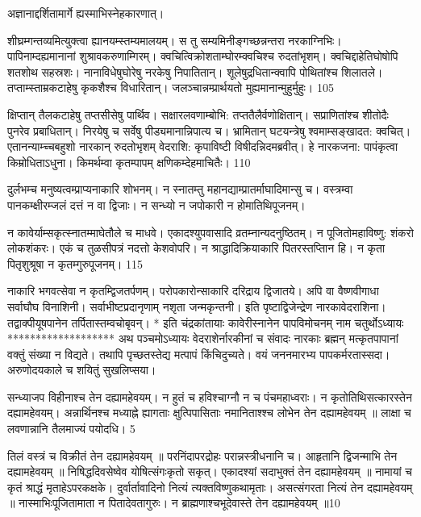   अज्ञानाद्दर्शितामार्गे ह्यस्माभिस्नेहकारणात्।
 

शीघ्रम्गन्तव्यमित्युक्त्वा ह्यानयम्स्तम्यमालयम्।
 स तु सम्यमिनीङ्गच्छन्नन्तरा नरकाग्निभिः।
 पापिनाम्दह्यमानानां शुश्रावकरुणाम्गिरम्।
 क्वचित्विक्रोशताम्घोरम्क्वचिश्च रुदतांभृशम्।
 क्वचिद्दाहेतिघोषोपि शतशोथ सहस्रशः।
 नानाविधेषुघोरेषु नरकेषु निपातितान्।
 शूलेषुद्रधितान्क्वापि पोथितांश्च शिलातले।
 तप्ताम्स्ताम्रकटाहेषु कृकशैश्च विधारितान्।
 जलञ्चान्नम्प्रार्थयतो मुह्यमानान्मुहुर्मुहुः।
 105

  क्षिप्तान् तैलकटाहेषु तप्तसीसेषु पार्थिव।
 सक्षारलवणाम्बोभि: तप्ततैलैर्वणोक्षितान्।
 सप्राणितांश्च शीतोदैः पुनरेव प्रबाधितान्।
 निरयेषु च सर्वेषु पीड्यमानान्निपात्य च।
 भ्रामितान् घटयन्त्रेषु श्वमाम्सङ्खादत: क्वचित्।
 एतानन्याम्च्चबहुशो नारकान् रुदतोभृशम् वेदराशि: कृपाविष्टी विषीदन्निदमब्रवीत्।
 हे नारकजना: पापंकृत्वा किम्रोधिताऽधुना।
 किमर्थम्वा कृतम्पापम् क्षणिकम्देहमाचितैः।
 110

  दुर्लभम्च मनुष्यत्वम्प्राप्यनाकारि शोभनम्।
 न स्नातम्तु महानद्याम्प्रातर्माघादिमान्सु च।
 वस्त्रम्वा पानकम्क्षीरम्जलं दत्तं न वा द्विजाः।
 न सन्ध्यो न जपोकारी न होमातिथिपूजनम्।
 

न कावेर्याम्सकृत्स्नातम्माघेतौले च माधवे।
 एकादश्युपवासादि व्रतम्नान्यदनुष्ठितम्।
 न पूजितोमहाविष्णु: शंकरो लोकशंकरः।
 एकं च तुळसीपत्रं नदत्तो केशवोपरि।
 न श्राद्धादिक्रियाकारि पितरस्तप्तिान हि।
 न कृता पितृशुश्रूषा न कृतम्गुरुपूजनम्।
 115

  नाकारि भगवत्सेवा न कृतम्द्विजतर्पणम्।
 परोपकारोन्साकारि दरिद्राय द्विजातये।
 अपि वा वैष्णवीगाधा सर्वाघौघ विनाशिनी।
 सर्वाभीष्टप्रदानृणाम् नशृता जन्मकृन्तनी।
 इति पृष्टाद्विजेन्द्रेण नारकावेदराशिना।
 तद्वाक्पीयूषपानेन तर्पितास्तम्वचोबृवन्।
 * इति चंद्रकांतायाः कावेरीस्नानेन पापविमोचनम् नाम
चतुर्थोऽध्यायः
*******************
अथ पञ्चमोऽध्यायः वेदराशेर्नारकीनां च संवादः
नारकाः
ब्रह्मन् मत्कृतपापानां वक्तुं संख्या न विद्यते।
 तथापि पृच्छतस्तेद्य मत्पापं किंचिदुच्यते।
 वयं जननमारभ्य पापकर्मरतास्सदा।
 अरुणोदयकाले च शयितुं सुखलिप्सया।
 


सन्ध्याजप विहीनाश्च तेन दह्यामहेवयम्।
 न हुतं च हविश्चाग्नौ न च पंचमहाध्वराः।
 न कृतोतिथिसत्कारस्तेन दह्यामहेवयम्।
 अन्नार्थिनश्च मध्याह्ने ह्यागताः क्षुत्पिपासिताः नमानिताश्श्च लोभेन तेन दह्यामहेवयम् ॥ लाक्षा च लवणान्नानि तैलमाज्यं पयोदधि।
 5

  तिलं वस्त्रं च विक्रीतं तेन दह्यामहेवयम् ॥ परनिंदापरद्रोहः परान्नस्त्रीधनानि च।
 आहृतानि द्विजन्माभि तेन दह्यामहेवयम् ॥ निषिद्धदिवसेष्वेव योषित्संगःकृतो सकृत्।
 एकादश्यां सदाभुक्तं तेन दह्यामहेवयम् ॥ नामायां च कृतं श्राद्धं मृताहेऽपरकक्षके।
 दुर्वार्तावादिनो नित्यं त्यक्तविष्णुकथामृताः।
 असत्संगरता नित्यं तेन दह्यामहेवयम् ॥ नास्माभिःपूजितामाता न पितादेवतागुरुः।
 न ब्राह्मणाश्चभूदेवास्ते तेन दह्यामहेवयम् ॥10

